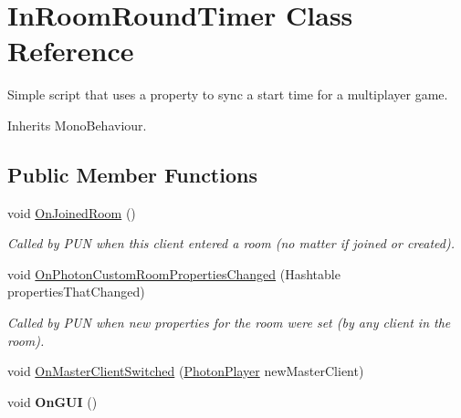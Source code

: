 \hypertarget{class_in_room_round_timer}{}\section{In\+Room\+Round\+Timer Class Reference}
\label{class_in_room_round_timer}


Simple script that uses a property to sync a start time for a multiplayer game.  




Inherits Mono\+Behaviour.

\subsection*{Public Member Functions}
\begin{DoxyCompactItemize}
\item 
void \hyperlink{class_in_room_round_timer_a17202ffb28b9e93f1d2379d79d1e9262}{On\+Joined\+Room} ()
\begin{DoxyCompactList}\small\item\em Called by P\+UN when this client entered a room (no matter if joined or created).\end{DoxyCompactList}\item 
void \hyperlink{class_in_room_round_timer_a226f64a8398f70b91ad6af4ea3b44bd8}{On\+Photon\+Custom\+Room\+Properties\+Changed} (Hashtable properties\+That\+Changed)
\begin{DoxyCompactList}\small\item\em Called by P\+UN when new properties for the room were set (by any client in the room).\end{DoxyCompactList}\item 
void \hyperlink{class_in_room_round_timer_ae136a34f3bf637b1b5610fd202ffa1e3}{On\+Master\+Client\+Switched} (\hyperlink{class_photon_player}{Photon\+Player} new\+Master\+Client)
\item 
void {\bfseries On\+G\+UI} ()\hypertarget{class_in_room_round_timer_a1c1cc2f294b32ed4dd293db35a9f4a7f}{}\label{class_in_room_round_timer_a1c1cc2f294b32ed4dd293db35a9f4a7f}

\end{DoxyCompactItemize}
